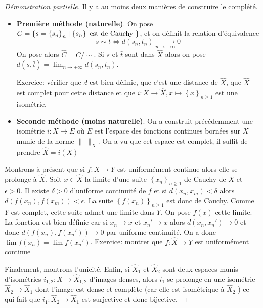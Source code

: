 \begin{proof}[Démonstration partielle]
Il y a au moins deux manières de construire le complété.
\begin{itemize}
    \item 
\textbf{Première méthode (naturelle)}. On pose $C= \left\{ s = \left\{ s_n \right\}_n \suchthat  \left\{ s_n \right\} \text{ est de Cauchy }   \right\} $, et on définit la relation d'équivalence \[
    s\sim t \iff  d(s_n, t_n) \xrightarrow[n\to+\infty]{}0
\]
On pose alors $\hat{C}=C / \sim$. Si $\bar{s}$ et $ \bar{t}$ sont dans $\hat{X}$ alors on pose $d(\bar{s}, \bar{t})=\lim_{n\to +\infty}d(s_n, t_n)$.

Exercice: vérifier que $d$ est bien définie, que c'est une distance de  $\hat{X}$, que $\hat{X}$ est complet pour cette distance et que $i:X \longrightarrow \hat{X}, x \longmapsto \bar{\left\{ x \right\}_{n\geq 1} }$ est une isométrie.

\item \textbf{Seconde méthode (moins naturelle)}. On a construit précédemment une isométrie $i:X \longrightarrow E$ où $E$ est l'espace des fonctions continues bornées sur  $X$ munie de la norme  $\|\;\|_X$. On a vu que cet espace est complet, il suffit de prendre $\hat{X}=\bar{i(X)}$
\end{itemize}

Montrons à présent que si $f: X \longrightarrow Y$ est uniformément continue alors elle se prolonge à $\hat{X}$.
Soit $x \in  \hat{X}$ la limite d'une suite $\left\{ x_n \right\} _{n\geq 1}$ de Cauchy de $X$ et  $\epsilon>0$. Il existe $\delta>0$ d'uniforme continuité de  $f$ et si $d(x_n, x_m)<\delta$ alors  $d(f(x_n), f(x_m))<\epsilon$. La suite $\left\{ f(x_n) \right\} _{n\geq 1}$ est donc de Cauchy. Comme $Y$ est complet, cette suite admet une limite dans  $Y$. On pose  $f(x)$ cette limite. La fonction est bien définie car si $x_n \longrightarrow  x$ et $x_n' \longrightarrow x$ alors $d(x_n, x_n')\longrightarrow 0$ et donc $d(f(x_n), f(x_n'))\longrightarrow 0$ par uniforme continuité. On a donc $\lim f(x_n)=\lim f(x_n')$. Exercice: montrer que  $f:\hat{X}\longrightarrow Y$ est uniformément continue

Finalement, montrons l'unicité.
Enfin, si $\hat{X}_{1}$ et $\hat{X}_{2}$ sont deux espaces munis d'isométries $i_{1,2}: X \longrightarrow  \hat{X}_{1,2}$ d'images denses, alors $i_{1}$ se prolonge en une isométrie $\hat{X}_{2} \longrightarrow \hat{X}_{1}$ dont l'image est dense et complète (car elle est isométrique à $\hat{X}_{2}$ ) ce qui fait que $i_{1}: \hat{X}_{2} \longrightarrow \hat{X}_{1}$ est surjective et donc bijective.
\end{proof}

